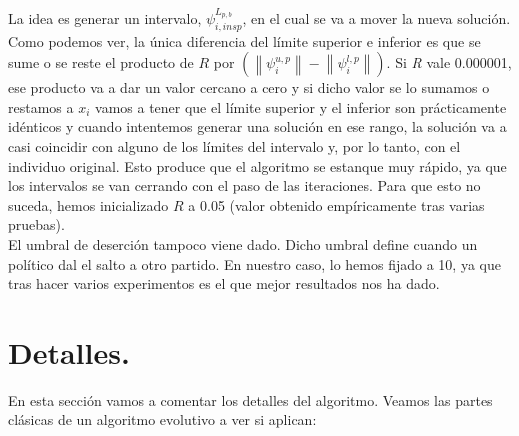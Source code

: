 \documentclass[12pt]{article}
\numberwithin{figure}{section} %
\numberwithin{table}{section} %
\begin{document}
	La idea es generar un intervalo, $\psi _{i, insp}^{L_{p,b}}$, en el cual se va a mover la nueva solución. Como podemos ver, la única diferencia del límite superior e inferior es que se sume o se reste el producto de $R$ por $\left ( \left \| \psi _{i}^{u, p} \right \| - \left \| \psi _{i}^{l, p} \right \| \right )$. Si \textit{R} vale 0.000001, ese producto va a dar un valor cercano a cero y si dicho valor se lo sumamos o restamos a $x_i$ vamos a tener que el límite superior y el inferior son prácticamente idénticos y cuando intentemos generar una solución en ese rango, la solución va a casi coincidir con alguno de los límites del intervalo y, por lo tanto, con el individuo original. Esto produce que el algoritmo se estanque muy rápido, ya que los intervalos se van cerrando con el paso de las iteraciones. Para que esto no suceda, hemos inicializado $R$ a 0.05 (valor obtenido empíricamente tras varias pruebas). \\ 
	
	El umbral de deserción tampoco viene dado. Dicho umbral define cuando un político dal el salto a otro partido. En nuestro caso, lo hemos fijado a 10, ya que tras hacer varios experimentos es el que mejor resultados nos ha dado.
	
	\section[Detalles.]{Detalles.}
	
	En esta sección vamos a comentar los detalles del algoritmo. Veamos las partes clásicas de un algoritmo evolutivo a ver si aplican:
	
\end{document}
